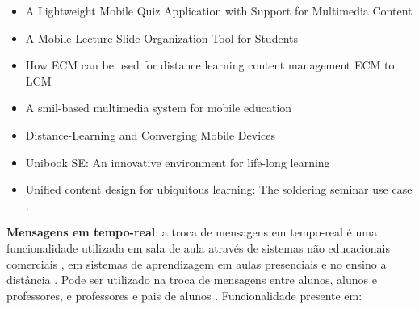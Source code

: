 \vspace{-5mm}
\begin{itemize}
\item A Lightweight Mobile Quiz Application with Support for Multimedia Content \cite{schon_lightweight_2012}
\item A Mobile Lecture Slide Organization Tool for Students \cite{chow_mobile_2006}
\item How ECM can be used for distance learning content management ECM to LCM \cite{daoudi_how_2012}
\item A smil-based multimedia system for mobile education \cite{di_smil-based_2009}
\item Distance-Learning and Converging Mobile Devices \cite{hoganson_distance-learning_2009}
\item Unibook SE: An innovative environment for life-long learning \cite{chimos_unibook_2012}
\item Unified content design for ubiquitous learning: The soldering seminar use case \cite{rodriguez-alsina_unified_2010}.
\end{itemize}

\textbf{Mensagens em tempo-real}: a troca de mensagens em tempo-real é uma funcionalidade utilizada em sala de aula através de sistemas não educacionais comerciais  \cite{yao_enhancing_2011}, em sistemas de aprendizagem em aulas presenciais \cite{griffioen_teaching_1998} e no ensino a distância \cite{rodriguez-alsina_unified_2010}. Pode ser utilizado na troca de mensagens entre alunos, alunos e professores, e professores e pais de alunos \cite{hashim_development_2012}. Funcionalidade presente em:

